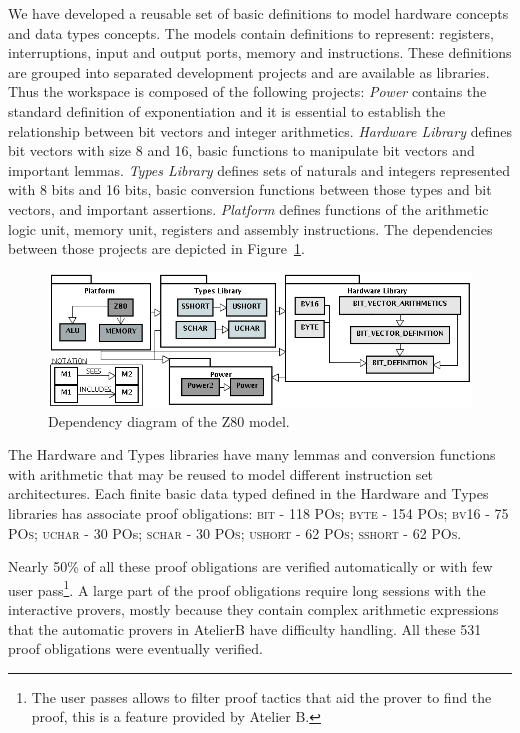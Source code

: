 \documentclass[a4paper]{llncs}
\begin{document}
We have developed a reusable set of basic definitions to model
hardware concepts and data types concepts. The models contain
definitions to represent: registers, interruptions, input and
output ports, memory and instructions. These definitions are grouped
into separated development projects and are available as libraries.
Thus the workspace is composed of the following projects: \textit{Power}
contains the standard definition of exponentiation and it is essential
to establish the relationship between bit vectors
and integer arithmetics. \textit{Hardware Library} defines bit vectors
with size 8 and 16, basic functions to manipulate bit vectors and
important lemmas. \textit{Types Library} defines sets of naturals and integers represented
with 8 bits and 16 bits, basic conversion functions between those
types and bit vectors, and important assertions. \textit{Platform} defines functions of the arithmetic logic unit, memory
unit, registers and assembly instructions. The dependencies between those projects are depicted in
Figure~\ref{fig:hardware-definition-graph}.

\begin{figure}[h]
\centering
\includegraphics[width=.87\textwidth]{diagramaEstrutural_vertical_ProB2.png}
 \caption{Dependency diagram of the Z80 model.}
\label{fig:hardware-definition-graph}
\end{figure}




The Hardware and Types libraries have many lemmas and conversion functions with arithmetic that may be reused to model different instruction set architectures. Each finite basic data typed defined in the Hardware and Types libraries has associate proof obligations: 
\textsc{bit} - 118 {\small \textsc{POs}}; \textsc{byte} - 154 {\small \textsc{POs}}; \textsc{bv16} - 75 {\small \textsc{POs}}; \textsc{uchar} -  30 {POs}; \textsc{schar} - 30 {\small \textsc{POs}}; \textsc{ushort} - 62 {\small \textsc{POs}}; \textsc{sshort}  - 62 {\small \textsc{POs}}.

Nearly 50\% of all these proof obligations are verified automatically or with few user pass\footnote{The user passes allows to filter proof tactics that aid the prover to find the proof, this is a feature provided by Atelier B.}. A large part of the proof obligations require long sessions with the interactive provers, mostly because they contain complex arithmetic expressions that the automatic provers in AtelierB have difficulty handling. 
All these 531 proof obligations were eventually verified. 
\end{document}
